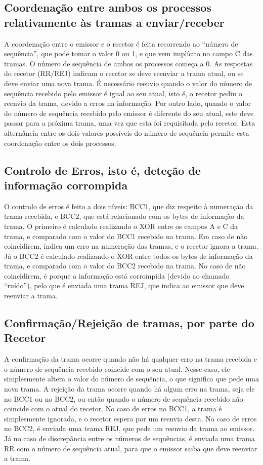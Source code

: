 \documentclass[article, a4paper, 11pt, oneside]{memoir}
\begin{document}
\subsection{Coordenação entre ambos os processos relativamente às tramas a enviar/receber}
A coordenação entre o emissor e o recetor é feita recorrendo ao “número de sequência”,
 que pode tomar o valor 0 ou 1, e que vem implícito no campo C das tramas. 
 O número de sequência de ambos os processos começa a 0. 
 As respostas do recetor (RR/REJ) indicam o recetor se deve reenviar a trama atual,
  ou se deve enviar uma nova trama. É necessário reenvio quando o valor do número de sequência 
  recebido pelo emissor é igual ao seu atual, isto é, o recetor pediu o reenvio da trama, 
  devido a erros na informação. Por outro lado, quando o valor do número de sequência recebido 
  pelo emissor é diferente do seu atual, este deve passar para a próxima trama, 
  uma vez que esta foi requisitada pelo recetor. Esta alternância entre os dois 
  valores possíveis do número de sequência permite esta coordenação entre os dois processos.

\subsection{Controlo de Erros, isto é, deteção de informação corrompida}
O controlo de erros é feito a dois níveis: BCC1, que diz respeito à numeração da trama recebida,
 e BCC2, que está relacionado com os bytes de informação da trama. 
 O primeiro é calculado realizando o XOR entre os campos A e C da trama, 
 e comparado com o valor do BCC1 recebido na trama. Em caso de não coincidirem, 
 indica um erro na numeração das tramas, e o recetor ignora a trama. Já o BCC2 é 
 calculado realizando o XOR entre todos os bytes de informação da trama, e 
 comparado com o valor do BCC2 recebido na trama. No caso de não coincidirem, 
 é porque a informação está corrompida (devido ao chamado “ruído”), 
 pelo que é enviada uma trama REJ, que indica ao emissor que deve reenviar a trama.

\subsection{Confirmação/Rejeição de tramas, por parte do Recetor}
A confirmação da trama ocorre quando não há qualquer erro na trama recebida e o número de sequência recebido coincide com o seu atual. 
Nesse caso, ele simplesmente altera o valor do número de sequência, o que significa que pede uma nova trama.
A rejeição da trama ocorre quando há algum erro na trama, seja ele no BCC1 ou no BCC2, ou então quando o número de sequência recebido não coincide com o atual do recetor.
 No caso de erros no BCC1, a trama é simplesmente ignorada, e o recetor espera por um reenvia desta. 
 No caso de erros no BCC2, é enviada uma trama REJ, que pede um reenvio da trama ao emissor. 
 Já no caso de discrepância entre os números de sequências, é enviada uma trama RR com o número de sequência atual, para que o emissor saiba que deve reenviar a trama.
\end{document}
